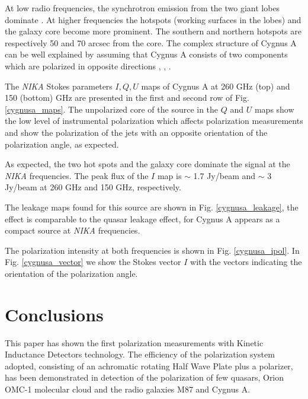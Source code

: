 \documentclass[twocolumn,traditabstract]{aa}
\begin{document}
At low radio frequencies, the synchrotron emission
from the two giant lobes dominate \citep{1974MNRAS.166..305H}. At higher frequencies the
hotspots (working surfaces in the lobes) and the galaxy core become more prominent.
The southern and northern hotspots are respectively 50 and 70 arcsec from the core.
The complex structure of Cygnus A can be well explained by assuming that Cygnus A consists of two components which are polarized in opposite directions \citep{1967ApJ...150L..15S}, \citep{1966SvA....10..214S}, \citep{1968ApJ...151...53M}.

The {\it NIKA} Stokes parameters $I, Q, U$ maps of Cygnus A at 260 GHz (top) and 150 (bottom) GHz are presented in
the first and second row of Fig. \ref{cygnusa_maps}.  
The  unpolarized core of the source in the $Q$ and $U$ maps show the low level of instrumental polarization which affects polarization measurements and show the polarization of the jets with an opposite orientation of the polarization angle, as expected.

As expected, the
two hot spots and the galaxy core dominate the signal at the {\it NIKA}
frequencies. The peak flux of the $I$ map is $\sim$ 1.7 Jy/beam and $\sim$ 3 Jy/beam at 260 GHz and 150 GHz, respectively. 

The leakage maps found for this source are shown in Fig. \ref{cygnusa_leakage}, the effect is comparable to the quasar leakage effect, for Cygnus A appears as a compact source at {\it NIKA} frequencies. 

The polarization intensity at both frequencies is shown in Fig. \ref{cygnusa_ipol}. In Fig. \ref{cygnusa_vector} we show the Stokes vector $I$ with the vectors indicating the orientation of the polarization angle. 






 
 \section{Conclusions}
This paper has shown the first polarization measurements with Kinetic Inductance Detectors technology. The efficiency of the polarization system adopted, consisting of an achromatic rotating Half Wave Plate plus a polarizer, has been demonstrated in detection of the polarization of few quasars, Orion OMC-1 molecular cloud and the radio galaxies M87 and Cygnus A. 
 
\end{document}
